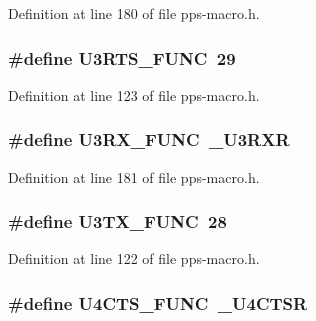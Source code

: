 Definition at line 180 of file pps-\/macro.\+h.

\hypertarget{pps-macro_8h_a5a90228bafd5a2cf50c101fef1a17424}{}
\subsubsection[{U3\+R\+T\+S\+\_\+\+F\+U\+N\+C}]{\setlength{\rightskip}{0pt plus 5cm}\#define U3\+R\+T\+S\+\_\+\+F\+U\+N\+C~29}\label{pps-macro_8h_a5a90228bafd5a2cf50c101fef1a17424}


Definition at line 123 of file pps-\/macro.\+h.

\hypertarget{pps-macro_8h_a17220cf7664f4d1ae834d718923b3c38}{}
\subsubsection[{U3\+R\+X\+\_\+\+F\+U\+N\+C}]{\setlength{\rightskip}{0pt plus 5cm}\#define U3\+R\+X\+\_\+\+F\+U\+N\+C~\+\_\+\+U3\+R\+X\+R}\label{pps-macro_8h_a17220cf7664f4d1ae834d718923b3c38}


Definition at line 181 of file pps-\/macro.\+h.

\hypertarget{pps-macro_8h_ab8bc397aca7e4b629eb154259063de56}{}
\subsubsection[{U3\+T\+X\+\_\+\+F\+U\+N\+C}]{\setlength{\rightskip}{0pt plus 5cm}\#define U3\+T\+X\+\_\+\+F\+U\+N\+C~28}\label{pps-macro_8h_ab8bc397aca7e4b629eb154259063de56}


Definition at line 122 of file pps-\/macro.\+h.

\hypertarget{pps-macro_8h_a74b59e75890d3dfb7a78e1085ab823af}{}
\subsubsection[{U4\+C\+T\+S\+\_\+\+F\+U\+N\+C}]{\setlength{\rightskip}{0pt plus 5cm}\#define U4\+C\+T\+S\+\_\+\+F\+U\+N\+C~\+\_\+\+U4\+C\+T\+S\+R}\label{pps-macro_8h_a74b59e75890d3dfb7a78e1085ab823af}


